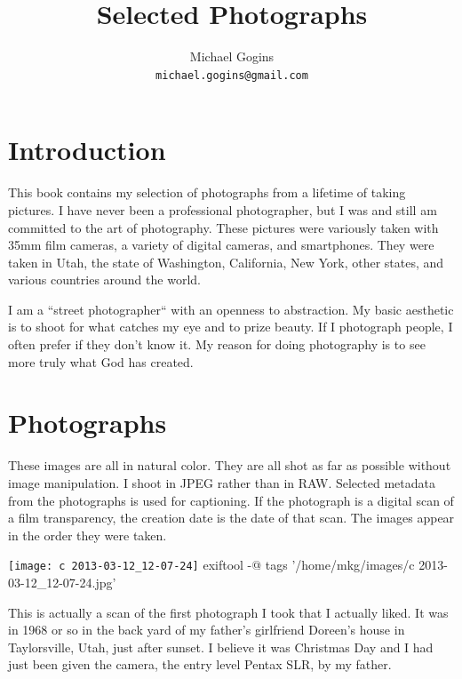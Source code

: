 \documentclass[11pt,chapterprefix=true,pagesize=letter]{scrbook}
\begin{document}
\title{Selected Photographs}
\author{Michael Gogins \\ \texttt{michael.gogins@gmail.com}}
\maketitle

\chapter*{Introduction}

This book contains my selection of photographs from a lifetime of taking pictures. I have never been a professional photographer, but I was and still am committed to the art of photography. These pictures were variously taken with 35mm film cameras, a variety of digital cameras, and smartphones. They were taken in Utah, the state of Washington, California, New York, other states, and various countries around the world. 

I am a ``street photographer`` with an openness to abstraction. My basic aesthetic is to shoot for what catches my eye and to prize beauty. If I photograph people, I often prefer if they don't know it. My reason for doing photography is to see more truly what God has created.

\chapter*{Photographs}

These images are all in natural color. They are all shot as far as possible without image manipulation. I shoot in JPEG rather than in RAW. Selected metadata from the photographs is used for captioning. If the photograph is a digital scan of a film transparency, the creation date is the date of that scan. The images appear in the order they were taken.


\newpage
\begin{center}
	\texttt{[image: c 2013-03-12\_12-07-24]}
	\bash[stdout]
	exiftool -@ tags '/home/mkg/images/c 2013-03-12_12-07-24.jpg'
	\END
\end{center}

\noindent This is actually a scan of the first photograph I took that I actually liked. It was in 1968 or so in the back yard of my father's girlfriend Doreen's house in Taylorsville, Utah, just after sunset. I believe it was Christmas Day and I had just been given the camera, the entry level Pentax SLR, by my father.
\end{document}
